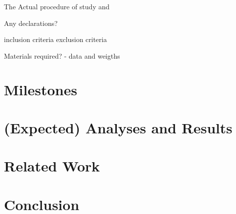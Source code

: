\documentclass[11pt]{article}
\begin{document}
The Actual procedure of study and 



Any declarations?

inclusion criteria
exclusion criteria


Materials required? 
- data and weigths


\section{Milestones}

\section{(Expected) Analyses and Results}
\section{Related Work}
\section{Conclusion}

\citep{Nobody06}

\printbibliography
\end{document}
